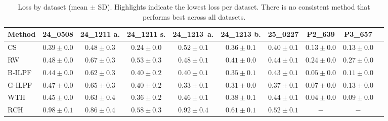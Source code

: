 \documentclass[iucr]{iucrjournals}
\begin{document}
\begin{table}[t]
\caption{Loss by dataset (mean $\pm$ SD). Highlights indicate the lowest loss per dataset. There is no consistent method that performs best across all datasets.}
\label{tab:method_by_dataset}
\centering
\small
\setlength{\tabcolsep}{4pt}
\renewcommand{\arraystretch}{1.0}
\begin{tabular}{@{}lccccccccc@{}}
\toprule
\textbf{Method} & \textbf{24\_0508} & \textbf{24\_1211 a.} & \textbf{24\_1211 s.} & \textbf{24\_1213\ a.} & \textbf{24\_1213 b.} & \textbf{25\_0227} & \textbf{P2\_639} & \textbf{P3\_657} \\
\midrule


CS   & \cellcolor{yellow!30}$0.39 \pm 0.0$ & \cellcolor{yellow!30}\textbf{$0.48 \pm 0.3$} & \cellcolor{yellow!30}\textbf{$0.24 \pm 0.0$} & $0.52 \pm 0.1$ & $0.36 \pm 0.1$ & $0.40 \pm 0.1$ & $0.13 \pm 0.0$ & $0.13 \pm 0.0$ \\
RW   & $0.48 \pm 0.0$ & $0.67 \pm 0.3$ & $0.53 \pm 0.3$ & $0.48 \pm 0.1$ & $0.41 \pm 0.0$ & $0.44 \pm 0.1$ & $0.24 \pm 0.0$ & $0.27 \pm 0.0$ \\
B-ILPF   & $0.44 \pm 0.0$ & $0.62 \pm 0.3$ & $0.40 \pm 0.2$ & $0.40 \pm 0.1$ & $0.35 \pm 0.1$ & $0.43 \pm 0.1$ & $0.05 \pm 0.0$ & $0.11 \pm 0.0$ \\
G-ILPF   & $0.47 \pm 0.0$ & $0.65 \pm 0.3$ & $0.40 \pm 0.2$ & \cellcolor{yellow!30}\textbf{$0.33 \pm 0.1$} & \cellcolor{yellow!30}\textbf{$0.31 \pm 0.0$} & \cellcolor{yellow!30}\textbf{$0.37 \pm 0.1$} & $0.07 \pm 0.0$ & $0.13 \pm 0.0$ \\
WTH  & $0.45 \pm 0.0$ & $0.63 \pm 0.4$ & $0.36 \pm 0.2$ & $0.46 \pm 0.1$ & $0.38 \pm 0.1$ & $0.44 \pm 0.1$ & \cellcolor{yellow!30}\textbf{$0.04 \pm 0.0$} & \cellcolor{yellow!30}\textbf{$0.09 \pm 0.0$} \\
RCH   & $0.98 \pm 0.1$ & $0.86 \pm 0.4$ & $0.58 \pm 0.3$ & $0.92 \pm 0.4$ & $0.61 \pm 0.1$ & $0.52 \pm 0.1$ & $-$ & $-$ \\


\bottomrule
\end{tabular}
\end{table}
\end{document}

